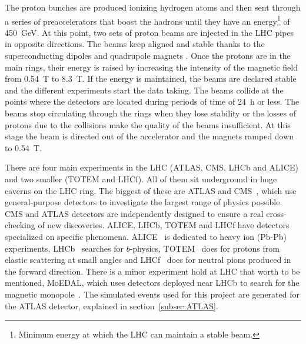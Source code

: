The proton bunches are produced ionizing hydrogen atoms and then sent through a series of preaccelerators that boost the hadrons until they have an energy\footnote{Minimum energy at which the LHC can maintain a stable beam.} of 450~GeV. At this point, two sets of proton beams are injected in the LHC pipes in opposite directions. The beams keep aligned and stable thanks to the superconducting dipoles and quadrupole magnets%
. Once the protons are in the main rings, their energy is raised by increasing the intensity of the magnetic field from 0.54~T to 8.3~T. If the energy is maintained, the beams are declared stable and the different experiments start the data taking. The beams collide at the points where the detectors are located during periods of time of 24~h or less. The beams stop circulating through the rings when they lose stability or the losses of protons due to the collisions make the quality of the beams insufficient. At this stage the beam is directed out of the accelerator and the magnets ramped down to 0.54~T.

There are four main experiments in the LHC (ATLAS, CMS, LHCb and ALICE) and two smaller (TOTEM and LHCf). All of them sit underground in huge caverns on the LHC ring. The biggest of these are ATLAS and CMS~\cite{Chatrchyan:2008aa}, which use general-purpose detectors to investigate the largest range of physics possible. CMS and ATLAS detectors are independently designed to ensure a real cross-checking of new discoveries. ALICE, LHCb, TOTEM and LHCf have detectors specialized on specific phenomena. ALICE~\cite{aamodt2008alice} is dedicated to heavy ion (Pb-Pb) experiments, LHCb~\cite{alves2008lhcb} searches for $b$-physics, TOTEM~\cite{anelli2008totem} does for protons from elastic scattering at small angles and LHCf~\cite{adriani2008lhcf} does for neutral pions produced in the forward direction. There is a minor experiment hold at LHC that worth to be mentioned, MoEDAL, which uses detectors deployed near LHCb to search for the magnetic monopole~\cite{pinfold2009technical}. The simulated events used for this project are generated for the ATLAS detector, explained in section~\ref{subsec:ATLAS}.

